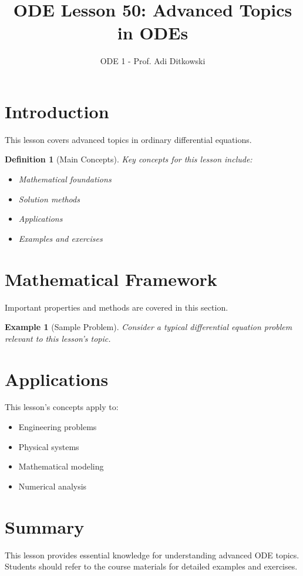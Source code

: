 \documentclass[12pt]{article}
\title{ODE Lesson 50: Advanced Topics in ODEs}
\author{ODE 1 - Prof. Adi Ditkowski}
\date{}
\newtheorem{definition}{Definition}
\newtheorem{example}{Example}
\begin{document}
\maketitle

\section{Introduction}

This lesson covers advanced topics in ordinary differential equations.

\begin{definition}[Main Concepts]
Key concepts for this lesson include:
\begin{itemize}
\item Mathematical foundations
\item Solution methods
\item Applications
\item Examples and exercises
\end{itemize}
\end{definition}

\section{Mathematical Framework}

\begin{keypoint}
Important properties and methods are covered in this section.
\end{keypoint}

\begin{example}[Sample Problem]
Consider a typical differential equation problem relevant to this lesson's topic.
\end{example}

\section{Applications}

This lesson's concepts apply to:
\begin{itemize}
\item Engineering problems
\item Physical systems
\item Mathematical modeling
\item Numerical analysis
\end{itemize}

\section{Summary}

This lesson provides essential knowledge for understanding advanced ODE topics.
Students should refer to the course materials for detailed examples and exercises.
\end{document}
